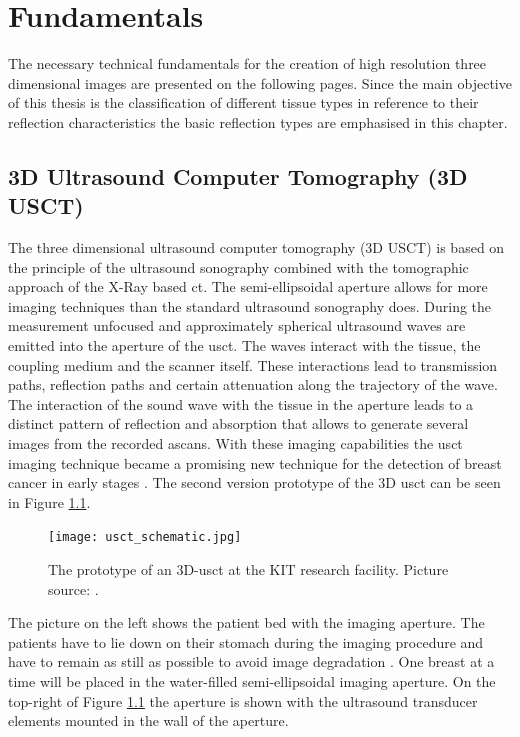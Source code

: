\chapter{Fundamentals}
\label{chap:mathFund}

The necessary technical fundamentals for the creation of high resolution three dimensional images are presented on the following pages. Since the main objective of this thesis is the classification of different tissue types in reference to their reflection characteristics the basic reflection types are emphasised in this chapter. 

\section{3D Ultrasound Computer Tomography (3D USCT)}
The three dimensional ultrasound computer tomography (3D USCT) is based on the principle of the ultrasound sonography combined with the tomographic approach of the X-Ray based \ac{ct}. The semi-ellipsoidal aperture allows for more imaging techniques than the standard ultrasound sonography does. During the measurement unfocused and approximately spherical ultrasound waves are emitted into the aperture of the \ac{usct}. The waves interact with the tissue, the coupling medium and the scanner itself. These interactions lead to transmission paths, reflection paths and certain attenuation along the trajectory of the wave. The interaction of the sound wave with the tissue in the aperture leads to a distinct pattern of reflection and absorption that allows to generate several images from the recorded \acp{ascan}.
With these imaging capabilities the \ac{usct} imaging technique became a promising new technique for the detection of breast cancer in early stages \cite{Ruiter2011RealizationUSCT}. The second version prototype of the 3D \ac{usct} can be seen in Figure \ref{usct_example}.

\begin{figure}[H]
    \centering
    \texttt{[image: usct\_schematic.jpg]}
    \caption{The prototype of an 3D-\ac{usct} at the KIT research facility. Picture source: \cite{Kretzek2014GPUAberration}. }
    \label{usct_example}
\end{figure}


 The picture on the left shows the patient bed with the imaging aperture. The patients have to lie down on their stomach during the imaging procedure and have to remain as still as possible to avoid image degradation \cite{Ruiter2011RealizationUSCT}. One breast at a time will be placed in the water-filled semi-ellipsoidal imaging aperture. On the top-right of Figure \ref{usct_example} the aperture is shown with the ultrasound transducer elements mounted in the wall of the aperture.


